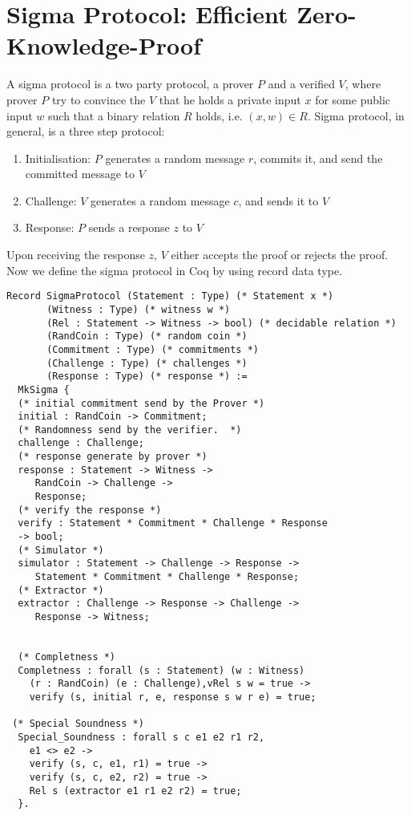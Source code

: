  



\section{Sigma Protocol: Efficient Zero-Knowledge-Proof}
\label{sec:sigma_coq}
A sigma protocol is a two party protocol, a prover $P$ and a verified $V$, where prover $P$ try to convince the $V$ that he 
holds a private input $x$ for some public input $w$ such that a binary relation $R$ holds, i.e. $(x, w) \in R$.  Sigma protocol, 
in general, is a three step protocol:
\begin{enumerate}
\item Initialisation: $P$ generates a random message $r$, commits it, and send the committed message to $V$
\item Challenge: $V$ generates a random message $c$, and sends it to $V$
\item Response: $P$ sends a response $z$ to $V$
\end{enumerate} 

\noindent
Upon receiving the response $z$, $V$ either accepts the proof or rejects the proof.  Now we define the sigma protocol in 
Coq by using record data type.

\begin{verbatim}
Record SigmaProtocol (Statement : Type) (* Statement x *)
       (Witness : Type) (* witness w *)
       (Rel : Statement -> Witness -> bool) (* decidable relation *)
       (RandCoin : Type) (* random coin *) 
       (Commitment : Type) (* commitments *)
       (Challenge : Type) (* challenges *) 
       (Response : Type) (* response *) :=
  MkSigma {
  (* initial commitment send by the Prover *)
  initial : RandCoin -> Commitment;
  (* Randomness send by the verifier.  *) 
  challenge : Challenge;
  (* response generate by prover *)
  response : Statement -> Witness ->
     RandCoin -> Challenge ->
     Response;
  (* verify the response *)
  verify : Statement * Commitment * Challenge * Response
  -> bool;
  (* Simulator *)
  simulator : Statement -> Challenge -> Response ->
     Statement * Commitment * Challenge * Response;
  (* Extractor *)
  extractor : Challenge -> Response -> Challenge -> 
     Response -> Witness;
  

  (* Completness *)
  Completness : forall (s : Statement) (w : Witness)
    (r : RandCoin) (e : Challenge),vRel s w = true -> 
    verify (s, initial r, e, response s w r e) = true;

 (* Special Soundness *)
  Special_Soundness : forall s c e1 e2 r1 r2,
    e1 <> e2 ->
    verify (s, c, e1, r1) = true ->
    verify (s, c, e2, r2) = true ->
    Rel s (extractor e1 r1 e2 r2) = true;
  }.
\end{verbatim}


